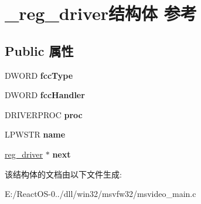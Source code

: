 \hypertarget{struct__reg__driver}{}\section{\+\_\+reg\+\_\+driver结构体 参考}
\label{struct__reg__driver}
\subsection*{Public 属性}
\begin{DoxyCompactItemize}
\item 
\mbox{\label{struct__reg__driver_aa6879271e64c23e50982cda8b6056aa5}} 
D\+W\+O\+RD {\bfseries fcc\+Type}
\item 
\mbox{\label{struct__reg__driver_ab7bb1fa46412fda09ac13e5b84fa9247}} 
D\+W\+O\+RD {\bfseries fcc\+Handler}
\item 
\mbox{\label{struct__reg__driver_ace840dcb7a9722c0d6b492ae82cd30bc}} 
D\+R\+I\+V\+E\+R\+P\+R\+OC {\bfseries proc}
\item 
\mbox{\label{struct__reg__driver_a39efd80951a77df5a288dccfe7ff2d55}} 
L\+P\+W\+S\+TR {\bfseries name}
\item 
\mbox{\label{struct__reg__driver_a9c0b042023004fb14167cd0377ae22f5}} 
\hyperlink{struct__reg__driver}{reg\+\_\+driver} $\ast$ {\bfseries next}
\end{DoxyCompactItemize}


该结构体的文档由以下文件生成\+:\begin{DoxyCompactItemize}
\item 
E\+:/\+React\+O\+S-\/0../dll/win32/msvfw32/msvideo\+\_\+main.\+c\end{DoxyCompactItemize}
